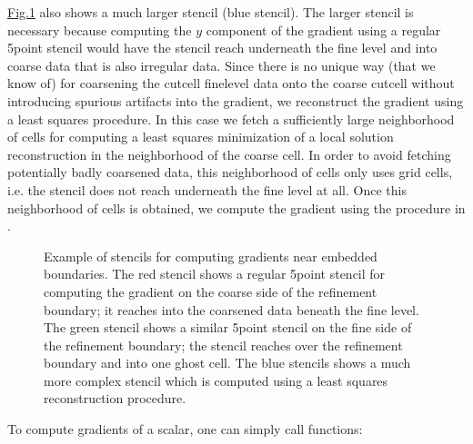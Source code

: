 \documentclass[letterpaper,10pt,english]{sphinxmanual}
\let\sphinxpxdimen\pdfpxdimen\else\newdimen\sphinxpxdimen
\begin{document}
\sphinxAtStartPar
\hyperref[\detokenize{Source/MeshData:fig-ebgradient}]{Fig.\@ \ref{\detokenize{Source/MeshData:fig-ebgradient}}} also shows a much larger stencil (blue stencil).
The larger stencil is necessary because computing the \(y\) component of the gradient using a regular 5\sphinxhyphen{}point stencil would have the stencil reach underneath the fine level and into coarse data that is also irregular data.
Since there is no unique way (that we know of) for coarsening the cut\sphinxhyphen{}cell fine\sphinxhyphen{}level data onto the coarse cut\sphinxhyphen{}cell without introducing spurious artifacts into the gradient, we reconstruct the gradient using a least squares procedure.
In this case we fetch a sufficiently large neighborhood of cells for computing a least squares minimization of a local solution reconstruction in the neighborhood of the coarse cell.
In order to avoid fetching potentially badly coarsened data, this neighborhood of cells only uses  grid cells, i.e. the stencil does not reach underneath the fine level at all.
Once this neighborhood of cells is obtained, we compute the gradient using the procedure in {\hyperref[\detokenize{Utilities/LeastSquares:chap-leastsquares}]{}}.

\begin{figure}[htb]
\centering
\capstart

\noindent\sphinxincludegraphics[width=480\sphinxpxdimen]{{EBGradient}.png}
\caption{Example of stencils for computing gradients near embedded boundaries.
The red stencil shows a regular 5\sphinxhyphen{}point stencil for computing the gradient on the coarse side of the refinement boundary; it reaches into the coarsened data beneath the fine level.
The green stencil shows a similar 5\sphinxhyphen{}point stencil on the fine side of the refinement boundary; the stencil reaches over the refinement boundary and into one ghost cell.
The blue stencils shows a much more complex stencil which is computed using a least squares reconstruction procedure.}\label{\detokenize{Source/MeshData:id4}}\label{\detokenize{Source/MeshData:fig-ebgradient}}\end{figure}

\sphinxAtStartPar
To compute gradients of a scalar, one can simply call  functions:
\end{document}
